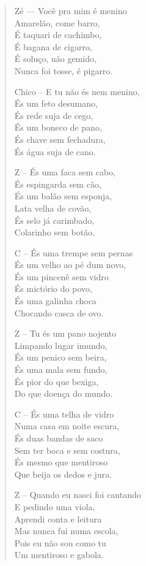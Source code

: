 \begin{verse}
Zé — Você pra mim é menino\\
Amarelão, come barro,\\
É taquari de cachimbo,\\
É bagana de cigarro,\\
É soluço, não gemido,\\
Nunca foi tosse, é pigarro.

Chico – E tu não és nem menino,\\
És um feto desumano,\\
És rede suja de cego,\\
És um boneco de pano,\\
És chave sem fechadura,\\
És água suja de cano.

Z – És uma faca sem cabo,\\
És espingarda sem cão,\\
És um balão sem esponja,\\
Lata velha de covão,\\
És selo já carimbado,\\
Colarinho sem botão.

C – És uma trempe sem pernas\\
És um velho ao pé dum novo,\\
És um pincenê sem vidro\\
És mictório do povo,\\
És uma galinha choca\\
Chocando casca de ovo.


Z – Tu és um pano nojento\\
Limpando lugar imundo,\\
És um penico sem beira,\\
És uma mala sem fundo,\\
És pior do que bexiga,\\
Do que doença do mundo.

C – És uma telha de vidro\\
Numa casa em noite escura,\\
És duas bandas de saco\\
Sem ter boca e sem costura,\\
És mesmo que mentiroso\\
Que beija os dedos e jura. 

Z – Quando eu nasci foi cantando\\
E pedindo uma viola,\\
Aprendi conta e leitura\\
Mas nunca fui numa escola,\\
Pois eu não sou como tu\\
Um mentiroso e gabola.


\end{verse}
